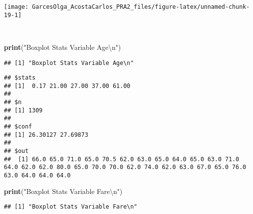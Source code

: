 \documentclass[
]{article}
\newenvironment{Shaded}{\begin{snugshade}}{\end{snugshade}}
\newcommand{\CharTok}[1]{\textcolor[rgb]{0.31,0.60,0.02}{#1}}
\newcommand{\DataTypeTok}[1]{\textcolor[rgb]{0.13,0.29,0.53}{#1}}
\newcommand{\FloatTok}[1]{\textcolor[rgb]{0.00,0.00,0.81}{#1}}
\newcommand{\KeywordTok}[1]{\textcolor[rgb]{0.13,0.29,0.53}{\textbf{#1}}}
\newcommand{\NormalTok}[1]{#1}
\newcommand{\OperatorTok}[1]{\textcolor[rgb]{0.81,0.36,0.00}{\textbf{#1}}}
\newcommand{\OtherTok}[1]{\textcolor[rgb]{0.56,0.35,0.01}{#1}}
\newcommand{\StringTok}[1]{\textcolor[rgb]{0.31,0.60,0.02}{#1}}
\begin{document}
\begin{center}\texttt{[image: GarcesOlga\_AcostaCarlos\_PRA2\_files/figure-latex/unnamed-chunk-19-1]} \end{center}

\texttt{}\\
\texttt{}

\begin{Shaded}
\begin{Highlighting}[]
\KeywordTok{print}\NormalTok{(}\StringTok{"Boxplot Stats Variable Age}\CharTok{\textbackslash{}n}\StringTok{"}\NormalTok{)}
\end{Highlighting}
\end{Shaded}

\begin{verbatim}
## [1] "Boxplot Stats Variable Age\n"
\end{verbatim}

\begin{Shaded}
\end{Shaded}

\begin{verbatim}
## $stats
## [1]  0.17 21.00 27.00 37.00 61.00
## 
## $n
## [1] 1309
## 
## $conf
## [1] 26.30127 27.69873
## 
## $out
##  [1] 66.0 65.0 71.0 65.0 70.5 62.0 63.0 65.0 64.0 65.0 63.0 71.0 64.0 62.0 62.0 80.0 65.0 70.0 70.0 62.0 74.0 62.0 63.0 67.0 65.0 76.0 63.0 64.0 64.0 64.0
\end{verbatim}

\begin{Shaded}
\begin{Highlighting}[]
\KeywordTok{print}\NormalTok{(}\StringTok{"Boxplot Stats Variable Fare}\CharTok{\textbackslash{}n}\StringTok{"}\NormalTok{)}
\end{Highlighting}
\end{Shaded}

\begin{verbatim}
## [1] "Boxplot Stats Variable Fare\n"
\end{verbatim}

\begin{Shaded}
\end{Shaded}
\end{document}
